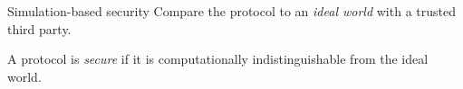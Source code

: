 \documentclass{beamer}
\begin{document}








\begin{frame}{Simulation-based security}
	\pause
	Compare the protocol to an \emph{ideal world} with a trusted third party.\pause



	A protocol is \emph{secure} if it is computationally indistinguishable
	from the ideal world.
\end{frame}
\end{document}
